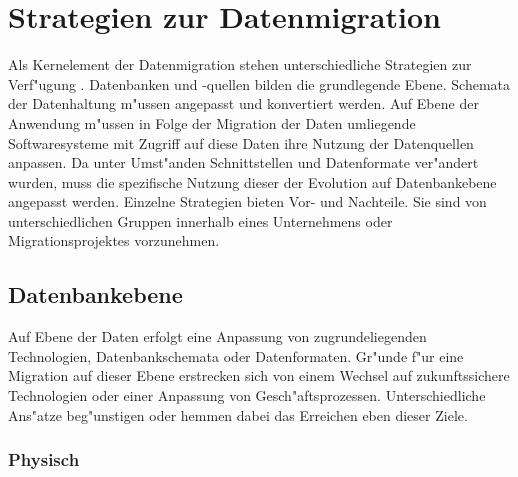 \section{Strategien zur Datenmigration}
\label{chapter:strategien}

Als Kernelement der Datenmigration stehen unterschiedliche Strategien zur Verf"ugung \citep{henrard-2002}. Datenbanken und -quellen bilden die grundlegende Ebene. Schemata der Datenhaltung m"ussen angepasst und konvertiert werden. Auf Ebene der Anwendung m"ussen in Folge der Migration der Daten umliegende Softwaresysteme mit Zugriff auf diese Daten ihre Nutzung der Datenquellen anpassen. Da unter Umst"anden Schnittstellen und Datenformate ver"andert wurden, muss die spezifische Nutzung dieser der Evolution auf Datenbankebene angepasst werden.
\lb
Einzelne Strategien bieten Vor- und Nachteile. Sie sind von unterschiedlichen Gruppen innerhalb eines Unternehmens oder Migrationsprojektes vorzunehmen.


\subsection{Datenbankebene}

Auf Ebene der Daten erfolgt eine Anpassung von zugrundeliegenden Technologien, Datenbankschemata oder Datenformaten. Gr"unde f"ur eine Migration auf dieser Ebene erstrecken sich von einem Wechsel auf zukunftssichere Technologien oder einer Anpassung von Gesch"aftsprozessen. Unterschiedliche Ans"atze beg"unstigen oder hemmen dabei das Erreichen eben dieser Ziele. 

\subsubsection{Physisch}

